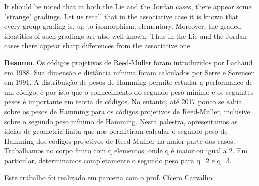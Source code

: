 	It should be noted that in both the Lie and the Jordan cases, there appear
	some "strange" gradings. Let us recall that in the associative case it is
	known that every group grading is, up to isomorphism, elementary.
	Moreover, the graded identities of such gradings are also well known. Thus
	in the Lie and the Jordan cases there appear sharp differences from the
	associative one.
	
	\vspace{24pt}



	\noindent\textbf{Resumo}.\label{vgln} 
	Os códigos projetivos de Reed-Muller foram introduzidos por Lachaud em 1988. Sua dimensão e distância mínima foram calculados por Serre e Sorensen em 1991. A distribuição de pesos de Hamming permite estudar a performance de um código, é por isto que o conhecimento do segundo peso mínimo e os seguintes pesos é importante em teoria de códigos. No entanto, até 2017 pouco se sabia sobre os pesos de Hamming para os códigos projetivos de Reed-Muller, inclusive sobre o segundo peso mínimo de Hamming. Nesta palestra, apresentamos as ideias de geometria finita que nos permitiram calcular o segundo peso de Hamming dos códigos projetivos de Reed-Mulller na maior parte dos casos. Trabalhamos no corpo finito com q elementos, onde q é maior ou igual a 2. Em particular, determinamos completamente o segundo peso para q=2 e q=3.

	\vspace*{0.5cm} \noindent Este trabalho foi realizado em parceria com o prof. Cícero Carvalho.

\vspace{24pt}



\clearpage	